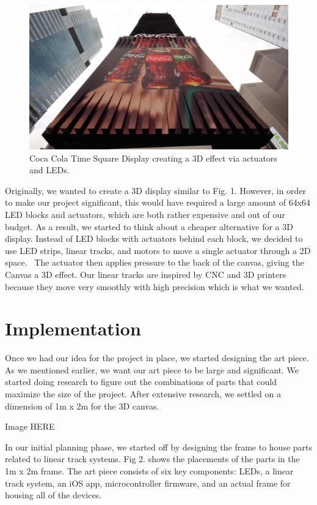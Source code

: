 \documentclass[12pt]{article}
\begin{document}
\begin{figure}[H]
  \centering
  \includegraphics[width=1\textwidth]{image1.png}
  \caption{Coca Cola Time Square Display creating a 3D effect via actuators and LEDs.}
  \label{fig:cocacola}
\end{figure}

Originally, we wanted to create a 3D display similar to Fig. 1. However, in order to make our project significant, this would have required a large amount of 64x64 LED blocks and actuators, which are both rather expensive and out of our budget. As a result, we started to think about a cheaper alternative for a 3D display. Instead of LED blocks with actuators behind each block, we decided to use LED strips, linear tracks, and motors to move a single actuator through a 2D space.  The actuator then applies pressure to the back of the canvas, giving the Canvas a 3D effect. Our linear tracks are inspired by CNC and 3D printers because they move very smoothly with high precision which is what we wanted.

\section{Implementation}
Once we had our idea for the project in place, we started designing the art piece. As we mentioned earlier, we want our art piece to be large and significant. We started doing research to figure out the combinations of parts that could maximize the size of the project. After extensive research, we settled on a dimension of 1m x 2m for the 3D canvas.

Image HERE

In our initial planning phase, we started off by designing the frame to house parts related to linear track systems. Fig 2. shows the placements of the parts in the 1m x 2m frame. The art piece consists of six key components: LEDs, a linear track system, an iOS app, microcontroller firmware, and an actual frame for housing all of the devices.
\end{document}
